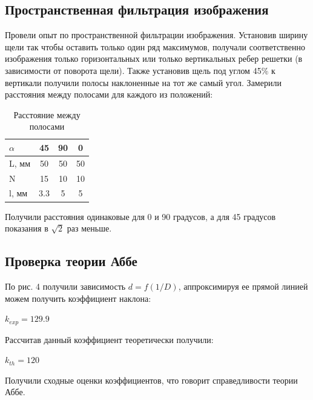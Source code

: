 \documentclass[a4paper, 12pt]{article}%
\begin{document}
	\subsection{Пространственная фильтрация изображения}
	Провели опыт по пространственной фильтрации изображения. Установив ширину щели так чтобы оставить только один ряд максимумов, получали соответственно изображения только горизонтальных или только вертикальных ребер решетки (в зависимости от поворота щели). Также установив щель под углом 45\% к вертикали получили полосы наклоненные на тот же самый угол. Замерили расстояния между полосами для каждого из положений: \\
	\begin{table}[H]
		\centering
		\begin{tabular}{|l|c|c|c|}
			\hline
			$\alpha$ & 45  & 90 & 0  \\ \hline
			L, мм & 50  & 50 & 50 \\ \hline
			N     & 15  & 10 & 10 \\ \hline
			l, мм & 3.3 & 5  & 5  \\ \hline
		\end{tabular}
		\caption{Расстояние между полосами}
	\end{table}
	Получили расстояния одинаковые для 0 и 90 градусов, а для 45 градусов показания в $\sqrt{2}$ раз меньше.
	\subsection{Проверка теории Аббе}
	По рис. 4 получили зависимость $d = f(1/D)$, аппроксимируя ее прямой линией можем получить коэффициент наклона:\\
	\begin{center}
		$k_{exp} = 129.9$\\
	\end{center}
	Рассчитав данный коэффициент теоретически получили:\\
	\begin{center}
			$k_{th} = 120$\\
	\end{center}
	Получили сходные оценки коэффициентов, что говорит справедливости теории Аббе.
\end{document}
